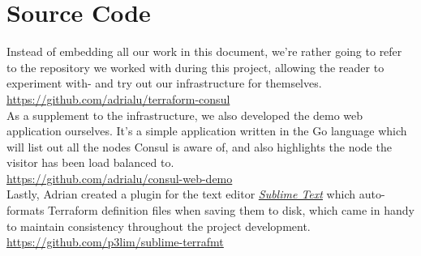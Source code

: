     
    
    
    \clearpage
    \appendix
    \section{Source Code} \label{appendix:repo}
        Instead of embedding all our work in this document, we're rather going to refer to the repository we worked with during this project, allowing the reader to experiment with- and try out our infrastructure for themselves.\\
        
        \href{https://github.com/adrialu/terraform-consul}{https://github.com/adrialu/terraform-consul}\\
        
        As a supplement to the infrastructure, we also developed the demo web application ourselves. It's a simple application written in the Go language which will list out all the nodes Consul is aware of, and also highlights the node the visitor has been load balanced to.\\
        
        \href{https://github.com/adrialu/consul-web-demo}{https://github.com/adrialu/consul-web-demo}\\
        
        Lastly, Adrian created a plugin for the text editor \href{https://www.sublimetext.com/}{\textit{Sublime Text}} which auto-formats Terraform definition files when saving them to disk, which came in handy to maintain consistency throughout the project development.\\
        
        \href{https://github.com/p3lim/sublime-terrafmt}{https://github.com/p3lim/sublime-terrafmt}


